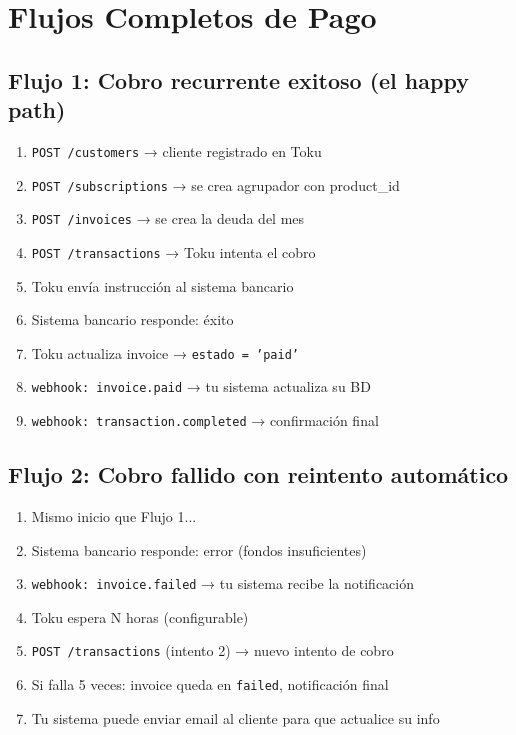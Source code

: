 \documentclass[11pt,a4paper]{article}
\begin{document}
\section{Flujos Completos de Pago}

\subsection{Flujo 1: Cobro recurrente exitoso (el happy path)}

\begin{tcolorbox}[colback=tokucyan!5,colframe=tokucyan]
\begin{enumerate}
  \item \texttt{POST /customers} → cliente registrado en Toku
  \item \texttt{POST /subscriptions} → se crea agrupador con product\_id
  \item \texttt{POST /invoices} → se crea la deuda del mes
  \item \texttt{POST /transactions} → Toku intenta el cobro
  \item Toku envía instrucción al sistema bancario
  \item Sistema bancario responde: éxito
  \item Toku actualiza invoice → \texttt{estado = 'paid'}
  \item \texttt{webhook: invoice.paid} → tu sistema actualiza su BD
  \item \texttt{webhook: transaction.completed} → confirmación final
\end{enumerate}
\end{tcolorbox}

\subsection{Flujo 2: Cobro fallido con reintento automático}

\begin{tcolorbox}[colback=alertred!5,colframe=alertred]
\begin{enumerate}
  \item Mismo inicio que Flujo 1...
  \item Sistema bancario responde: error (fondos insuficientes)
  \item \texttt{webhook: invoice.failed} → tu sistema recibe la notificación
  \item Toku espera N horas (configurable)
  \item \texttt{POST /transactions} (intento 2) → nuevo intento de cobro
  \item Si falla 5 veces: invoice queda en \texttt{failed}, notificación final
  \item Tu sistema puede enviar email al cliente para que actualice su info
\end{enumerate}
\end{tcolorbox}
\end{document}
